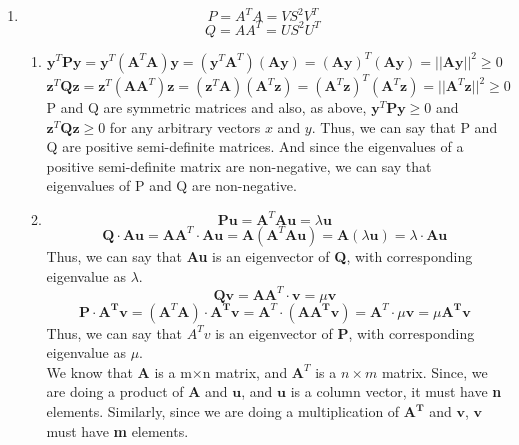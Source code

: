 \documentclass{article}
\begin{document}
\begin{enumerate}
\begin{enumerate}
        \item 
        \[
            P = A^T A = V S^2 V^T
        \]
        \[
            Q = AA^T = U S^2 U^T
        \]
        \begin{enumerate}
            \item 
            \[
                \textbf{y}^T \textbf{P} \textbf{y} = \textbf{y}^T ( \textbf{A}^T \textbf{A} ) \textbf{y} = (\textbf{y}^T \textbf{A}^T) (\textbf{A} \textbf{y}) = (\textbf{A} \textbf{y})^T (\textbf{A} \textbf{y}) = || \textbf{A} \textbf{y} ||^2 \geq 0
            \]
            \[
                \textbf{z}^T \textbf{Q} \textbf{z} = \textbf{z}^T ( \textbf{A} \textbf{A}^T ) \textbf{z} = (\textbf{z}^T \textbf{A}) (\textbf{A}^T \textbf{z}) = (\textbf{A}^T \textbf{z})^T (\textbf{A}^T \textbf{z}) = || \textbf{A}^T \textbf{z} ||^2 \geq 0
            \]
            P and Q are symmetric matrices and also, as above, $\textbf{y}^T \textbf{P} \textbf{y} \geq 0$ and $\textbf{z}^T \textbf{Q} \textbf{z} \geq 0$ for any arbitrary vectors $x$ and $y$. Thus, we can say that P and Q are positive semi-definite matrices. And since the eigenvalues of a positive semi-definite matrix are non-negative, we can say that eigenvalues of P and Q are non-negative.
            
            \item 
            \[
                \textbf{P} \textbf{u} = \textbf{A}^T \textbf{A} \textbf{u} = \textbf{$\lambda$} \textbf{u}
            \]
            \[
                \textbf{Q} \cdot \textbf{Au} = \textbf{A} \textbf{A}^T \cdot \textbf{Au} = \textbf{A} ( \textbf{A}^T \textbf{Au} ) = \textbf{A} ( \lambda \textbf{u}) = \lambda \cdot \textbf{Au}
            \]
            Thus, we can say that \textbf{Au} is an eigenvector of \textbf{Q}, with corresponding eigenvalue as $\lambda$. \\ 
            \[
                \boldsymbol{Q} \boldsymbol{v} = \boldsymbol{AA}^T \cdot \boldsymbol{v} = \mu \boldsymbol{v}
            \]
            \[
                \boldsymbol{P} \cdot \boldsymbol{A^Tv} = (\boldsymbol{A}^T \boldsymbol{A}) \cdot \boldsymbol{A^Tv} = \boldsymbol{A}^T \cdot (\boldsymbol{A A^T v}) = \boldsymbol{A}^T \cdot \mu \boldsymbol{v} = \mu \boldsymbol{A^T v}
            \]
            Thus, we can say that \textbf{$A^Tv$} is an eigenvector of \textbf{P}, with corresponding eigenvalue as $\mu$. \\ 
            We know that $\boldsymbol{A}$ is a m$\times$n matrix, and $\boldsymbol{A}^T$ is a $n\times m$ matrix. Since, we are doing a product of $\boldsymbol{A}$ and $\boldsymbol{u}$, and $\boldsymbol{u}$ is a column vector, it must have \textbf{n} elements. Similarly, since we are doing a multiplication of $\boldsymbol{A^T}$ and $\boldsymbol{v}$, $\boldsymbol{v}$ must have \textbf{m} elements.
            

\end{enumerate}
\end{enumerate}
\end{enumerate}
\end{document}
